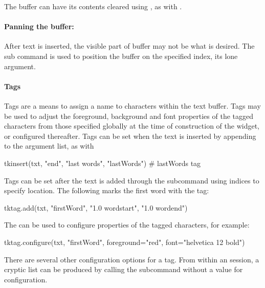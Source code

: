 The buffer can have its contents cleared using , as
with .

\paragraph{Panning the buffer: }
After text is inserted, the visible part of buffer may not be what is
desired. The  sub command is used to position
the buffer on the specified index, its lone argument.


\paragraph{Tags}
Tags are a means to assign a name to characters within the text
buffer. Tags may be used to adjust the foreground, background and font
properties of the tagged characters from those specified globally at
the time of construction of the widget, or configured thereafter. Tags
can be set when the text is inserted by appending to the argument
list, as with
\begin{Schunk}
\begin{Sinput}
 tkinsert(txt, "end", "last words", "lastWords") # lastWords tag
\end{Sinput}
\end{Schunk}

Tags can be set after the text is added through the
 subcommand using indices to specify
location. The following marks the first word with the 
tag:
\begin{Schunk}
\begin{Sinput}
 tktag.add(txt, "firstWord", "1.0 wordstart", "1.0 wordend")
\end{Sinput}
\end{Schunk}
The  can be used to configure properties of the tagged characters, for example:
\begin{Schunk}
\begin{Sinput}
 tktag.configure(txt, "firstWord", foreground="red", 
                 font="helvetica 12 bold")
\end{Sinput}
\end{Schunk}
%
There are several other configuration options for a tag. From within
an \R\/ session, a cryptic list can be produced by calling the
subcommand  without a value for
configuration.


